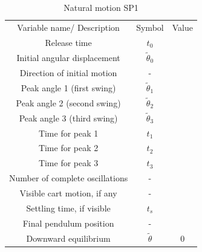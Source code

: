 \begin{table}
    \centering
    \begin{tabular}{ccc}
           Variable name/ Description& Symbol &Value\\
           Release time&  $t_0$&\\
           Initial angular displacement&   $\tilde\theta_0$&\\
           Direction of initial motion&  -&\\
           Peak angle 1 (first swing)&  $\tilde\theta_1$&\\
           Peak angle 2 (second swing)&  $\tilde\theta_2$&\\
           Peak angle 3 (third swing)&  $\tilde\theta_3$&\\
 Time for peak 1& $t_1$&\\
 Time for peak 2& $t_2$&\\
 Time for peak 3& $t_3$&\\
 Number of complete oscillations& -&\\
 Visible cart motion, if any& -&\\
 Settling time, if visible& $t_s$&\\
 Final pendulum position& -&\\
 Downward equilibrium& $\tilde\theta$&0\\
    \end{tabular}
    \caption{Natural motion SP1}
    \label{tab:placeholder}
\end{table}

